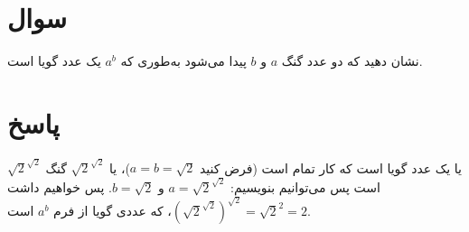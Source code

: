 \documentclass{article}
\begin{document}
\section{سوال}

نشان دهید که دو عدد گنگ $a$ و $b$ پیدا می‌شود به‌طوری که $a^{b}$ یک عدد گویا است.

\section{پاسخ}

$\sqrt{2}^{\sqrt{2}}$ یا یک عدد گویا است که کار تمام است (فرض کنید $a=b=\sqrt{2}$)، یا $\sqrt{2}^{\sqrt{2}}$ گنگ است پس می‌توانیم بنویسیم: $a=\sqrt{2}^{\sqrt{2}}$ و $b=\sqrt{2}$. پس خواهیم داشت $\left(\sqrt{2}^{\sqrt{2}}\right)^{\sqrt{2}}=\sqrt{2}^{2}=2$، که عددی گویا از فرم $a^{b}$ است.
\end{document}
